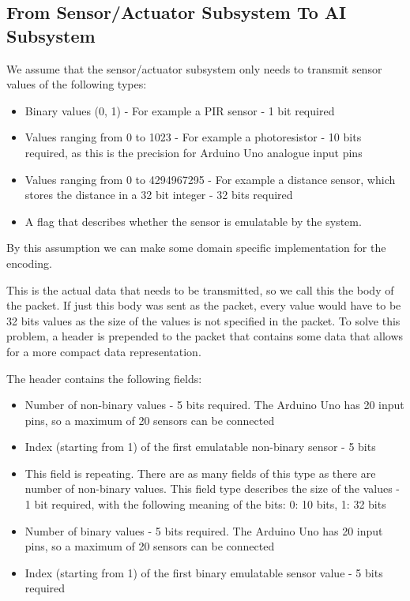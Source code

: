 \subsection{From Sensor/Actuator Subsystem To AI Subsystem}
We assume that the sensor/actuator subsystem only needs to transmit sensor values of the following types:

\begin{itemize}
\item Binary values (0, 1) - For example a PIR sensor - 1 bit required
\item Values ranging from 0 to 1023 - For example a photoresistor - 10 bits required, as this is the precision for Arduino Uno analogue input pins
\item Values ranging from 0 to 4294967295 - For example a distance sensor, which stores the distance in a 32 bit integer - 32 bits required
\item A flag that describes whether the sensor is emulatable by the system.
\end{itemize}
By this assumption we can make some domain specific implementation for the encoding.

This is the actual data that needs to be transmitted, so we call this the body of the packet. If just this body was sent as the packet, every value would have to be 32 bits values as the size of the values is not specified in the packet. To solve this problem, a header is prepended to the packet that contains some data that allows for a more compact data representation.

The header contains the following fields:

\begin{itemize}
\item Number of non-binary values - 5 bits required. The Arduino Uno has 20 input pins, so a maximum of 20 sensors can be connected
\item Index (starting from 1) of the first emulatable non-binary sensor - 5 bits
\item This field is repeating. There are as many fields of this type as there are number of non-binary values. This field type describes the size of the values - 1 bit required, with the following meaning of the bits: 0: 10 bits, 1: 32 bits
\item Number of binary values - 5 bits required. The Arduino Uno has 20 input pins, so a maximum of 20 sensors can be connected
\item Index (starting from 1) of the first binary emulatable sensor value - 5 bits required
\end{itemize}

